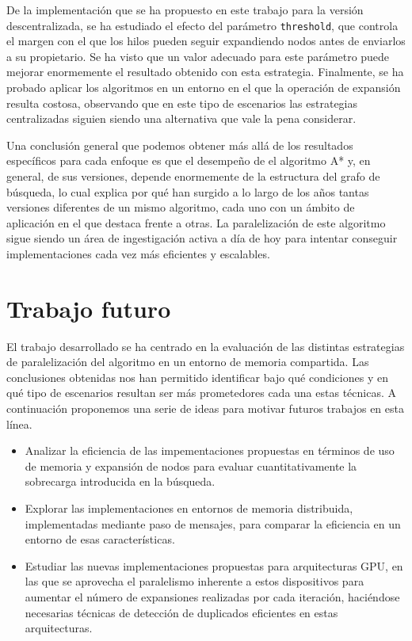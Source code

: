 \documentclass[a4paper,12pt]{article}
\begin{document}
De la implementación que se ha propuesto en este trabajo para la versión descentralizada, se ha estudiado el efecto del parámetro \verb|threshold|, que controla el margen con el que los hilos pueden seguir expandiendo nodos antes de enviarlos a su propietario. Se ha visto que un valor adecuado para este parámetro puede mejorar enormemente el resultado obtenido con esta estrategia. Finalmente, se ha probado aplicar los algoritmos en un entorno en el que la operación de expansión resulta costosa, observando que en este tipo de escenarios las estrategias centralizadas siguien siendo una alternativa que vale la pena considerar.

Una conclusión general que podemos obtener más allá de los resultados específicos para cada enfoque es que el desempeño de el algoritmo A* y, en general, de sus versiones, depende enormemente de la estructura del grafo de búsqueda, lo cual explica por qué han surgido a lo largo de los años tantas versiones diferentes de un mismo algoritmo, cada uno con un ámbito de aplicación en el que destaca frente a otras. La paralelización de este algoritmo sigue siendo un área de ingestigación activa a día de hoy para intentar conseguir implementaciones cada vez más eficientes y escalables.

\newpage

\section{Trabajo futuro} \label{sec:futuro}

El trabajo desarrollado se ha centrado en la evaluación de las distintas estrategias de paralelización del algoritmo en un entorno de memoria compartida. Las conclusiones obtenidas nos han permitido identificar bajo qué condiciones y en qué tipo de escenarios resultan ser más prometedores cada una estas técnicas. A continuación proponemos una serie de ideas para motivar futuros trabajos en esta línea.

\begin{itemize}
    \item Analizar la eficiencia de las impementaciones propuestas en términos de uso de memoria y expansión de nodos para evaluar cuantitativamente la sobrecarga introducida en la búsqueda.
    \item Explorar las implementaciones en entornos de memoria distribuida, implementadas mediante paso de mensajes, para comparar la eficiencia en un entorno de esas características.
    \item Estudiar las nuevas implementaciones propuestas para arquitecturas GPU, en las que se aprovecha el paralelismo inherente a estos dispositivos para aumentar el número de expansiones realizadas por cada iteración, haciéndose necesarias técnicas de detección de duplicados eficientes en estas arquitecturas.
\end{itemize}

\newpage






\appendix
\end{document}
